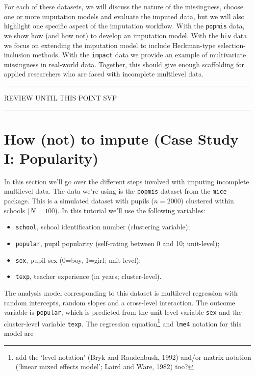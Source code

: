 \documentclass[
]{jss}
\providecommand{\tightlist}{%
  \setlength{\itemsep}{0pt}\setlength{\parskip}{0pt}}
\begin{document}
For each of these datasets, we will discuss the nature of the
missingness, choose one or more imputation models and evaluate the
imputed data, but we will also highlight one specific aspect of the
imputation workflow. With the \texttt{popmis} data, we show how (and how
not) to develop an imputation model. With the \texttt{hiv} data we focus
on extending the imputation model to include Heckman-type
selection-inclusion methods. With the \texttt{impact} data we provide an
example of multivariate missingness in real-world data. Together, this
should give enough scaffolding for applied researchers who are faced
with incomplete multilevel data.

\begin{center}\rule{0.5\linewidth}{0.5pt}\end{center}

\begin{center}
REVIEW UNTIL THIS POINT SVP
\end{center}

\begin{center}\rule{0.5\linewidth}{0.5pt}\end{center}

\hypertarget{how-not-to-impute-case-study-i-popularity}{%
\section{How (not) to impute (Case Study I:
Popularity)}\label{how-not-to-impute-case-study-i-popularity}}

In this section we'll go over the different steps involved with imputing
incomplete multilevel data. The data we're using is the \texttt{popmis}
dataset from the \texttt{mice} package. This is a simulated dataset with
pupils (\(n = 2000\)) clustered within schools (\(N = 100\)). In this
tutorial we'll use the following variables:

\begin{itemize}
\tightlist
\item
  \texttt{school}, school identification number (clustering variable);
\item
  \texttt{popular}, pupil popularity (self-rating between 0 and 10;
  unit-level);
\item
  \texttt{sex}, pupil sex (0=boy, 1=girl; unit-level);
\item
  \texttt{texp}, teacher experience (in years; cluster-level).
\end{itemize}

The analysis model corresponding to this dataset is multilevel
regression with random intercepts, random slopes and a cross-level
interaction. The outcome variable is \texttt{popular}, which is
predicted from the unit-level variable \texttt{sex} and the
cluster-level variable \texttt{texp}. The regression equation\footnote{add
  the `level notation' (Bryk and Raudenbush, 1992) and/or matrix
  notation (`linear mixed effects model'; Laird and Ware, 1982) too?}
and \texttt{lme4} notation for this model are
\end{document}
